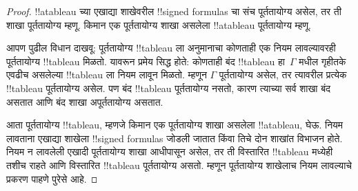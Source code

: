 \documentclass[../../../include/open-logic-section]{subfiles}
\begin{document}
\begin{proof}
!!a{tableau} च्या एखाद्या शाखेवरील
!!{signed formula}s चा संच
पूर्ततायोग्य असेल, तर ती शाखा
पूर्ततायोग्य म्हणू. किमान एक
पूर्ततायोग्य शाखा असलेला
!!a{tableau} पूर्ततायोग्य म्हणू.

आपण पुढील विधान दाखवू:
पूर्ततायोग्य !!{tableau} ला अनुमानाचा
कोणताही एक नियम लावल्यावरही
पूर्ततायोग्य !!{tableau} मिळतो.
यावरून प्रमेय सिद्ध होते: कोणताही
बंद !!{tableau} हा~$\Gamma$
मधील गृहीतके एवढीच असलेल्या
!!{tableau} ला नियम लावून मिळतो.
म्हणून $\Gamma$ पूर्ततायोग्य
असेल, तर त्यावरील प्रत्येक
!!{tableau} पूर्ततायोग्य असेल.
पण बंद !!{tableau} पूर्ततायोग्य
नसतो, कारण त्याच्या सर्व शाखा
बंद असतात आणि बंद शाखा
अपूर्ततायोग्य असतात.

आता पूर्ततायोग्य !!{tableau},
म्हणजे किमान एक पूर्ततायोग्य शाखा
असलेला !!a{tableau}, घेऊ.
नियम लावताना एखाद्या शाखेला
!!{signed formula}s जोडली जातात
किंवा तिचे दोन शाखांत विभाजन
होते. नियम न लावलेली एखादी
पूर्ततायोग्य शाखा आधीपासून
असेल, तर ती विस्तारित
!!{tableau} मध्येही तशीच
राहते आणि विस्तारित !!{tableau}
पूर्ततायोग्य असतो. म्हणून
पूर्ततायोग्य शाखेलाच नियम
लावल्याचे प्रकरण पाहणे पुरेसे आहे.


\end{proof}
\end{document}

